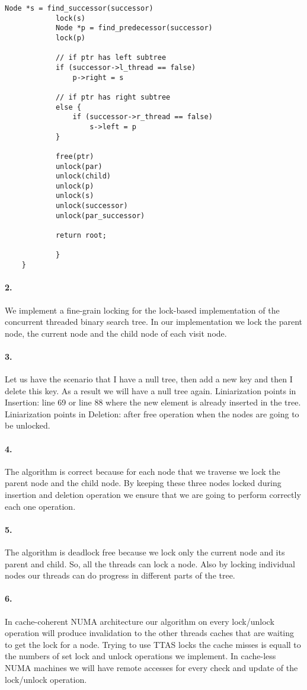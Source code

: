 \begin{lstlisting}[style=mycode]
			Node *s = find_successor(successor)
			lock(s)
			Node *p = find_predecessor(successor)
			lock(p)

			// if ptr has left subtree
			if (successor->l_thread == false)
				p->right = s

			// if ptr has right subtree
			else {
				if (successor->r_thread == false)
					s->left = p
			}

			free(ptr)
			unlock(par)
			unlock(child)
			unlock(p)
			unlock(s)
			unlock(successor)
			unlock(par_successor)

			return root;
				
			}
	}

\end{lstlisting}

\paragraph{2.}
We implement a fine-grain locking for the lock-based implementation of
the concurrent threaded binary search tree. In our implementation we
lock the parent node, the current node and the child node of each
visit node.

\paragraph{3.}
Let us have the scenario that I have a null tree, then add a new key
and then I delete this key. As a result we will have a null tree
again.
Liniarization points in Insertion: line 69 or line 88 where the new
element is already inserted in the tree.
Liniarization points in Deletion: after free operation when the nodes
are going to be unlocked.

\paragraph{4.}
The algorithm is correct because for each node that we traverse we
lock the parent node and the child node. By keeping these three nodes
locked during insertion and deletion operation we ensure that we are
going to perform correctly each one operation.

\paragraph{5.}
The algorithm is deadlock free because we lock only the current node
and its parent and child. So, all the threads can lock a node. Also by
locking individual nodes our threads can do progress in different
parts of the tree.

\paragraph{6.}
In cache-coherent NUMA architecture our algorithm on every lock/unlock
operation will produce invalidation to the other threads caches that
are waiting to get the lock for a node. Trying to use TTAS locks the
cache misses is equall to the numbers of set lock and unlock
operations we implement. In cache-less NUMA machines we will have
remote accesses for every check and update of the lock/unlock
operation. 

